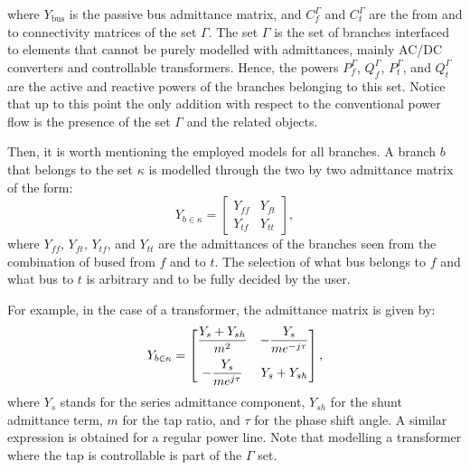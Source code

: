 \documentclass[11pt]{article}
\begin{document}
where $Y_\text{bus}$ is the passive bus admittance matrix, and $C_f^\Gamma$ and $C_t^\Gamma$ are the from and to connectivity matrices of the set $\Gamma$. The set $\Gamma$ is the set of branches interfaced to elements that cannot be purely modelled with admittances, mainly AC/DC converters and controllable transformers. Hence, the powers $P^\Gamma_f$, $Q^\Gamma_f$, $P^\Gamma_t$, and $Q^\Gamma_t$ are the active and reactive powers of the branches belonging to this set. Notice that up to this point the only addition with respect to the conventional power flow is the presence of the set $\Gamma$ and the related objects.

Then, it is worth mentioning the employed models for all branches. A branch $b$ that belongs to the set $\kappa$ is modelled through the two by two admittance matrix of the form:
\begin{equation}
	Y_{b\in\kappa} = 
	\begin{bmatrix}
		Y_{ff} & Y_{ft} \\
		Y_{tf} & Y_{tt}
	\end{bmatrix},
\end{equation}
where $Y_{ff}$, $Y_{ft}$, $Y_{tf}$, and $Y_{tt}$ are the admittances of the branches seen from the combination of bused from $f$ and to $t$. The selection of what bus belongs to $f$ and what bus to $t$ is arbitrary and to be fully decided by the user. 

For example, in the case of a transformer, the admittance matrix is given by:
\begin{equation}
	Y_{b\in \kappa} = 
	\begin{bmatrix}
		\dfrac{Y_s + Y_{sh}}{m^2} & -\dfrac{Y_s}{me^{-j\tau}} \vspace{0.2cm} \\
		-\dfrac{Y_s}{me^{j\tau}} & Y_s + Y_{sh} \\
	\end{bmatrix},
\end{equation}
where $Y_s$ stands for the series admittance component, $Y_{sh}$ for the shunt admittance term, $m$ for the tap ratio, and $\tau$ for the phase shift angle. A similar expression is obtained for a regular power line. Note that modelling a transformer where the tap is controllable is part of the $\Gamma$ set.
\end{document}
